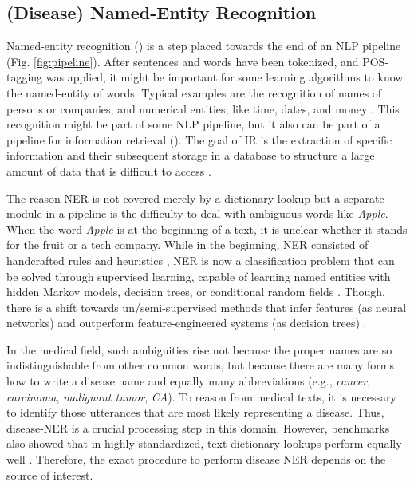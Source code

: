 \subsection{(Disease) Named-Entity Recognition}
  Named-entity recognition () is a step placed towards the end of an NLP pipeline (Fig. \ref{fig:pipeline}).
  After sentences and words have been tokenized, and POS-tagging was applied, it might be important for some learning algorithms to know the named-entity of words.
  Typical examples are the recognition of names of persons or companies, and numerical entities, like time, dates, and money \citep{Nadeau2009}.
  This recognition might be part of some NLP pipeline, but it also can be part of a pipeline for information retrieval ().
  The goal of IR is the extraction of specific information and their subsequent storage in a database to structure a large amount of data that is difficult to access \citep{Manning2008, Wei2011}.

  The reason NER is not covered merely by a dictionary lookup but a separate module in a pipeline is the difficulty to deal with ambiguous words like \textit{Apple}.
  When the word \textit{Apple} is at the beginning of a text, it is unclear whether it stands for the fruit or a tech company.
  While in the beginning, NER consisted of handcrafted rules and heuristics \citep{Rau1991}, NER is now a classification problem that can be solved through supervised learning, capable of learning named entities with hidden Markov models, decision trees, or conditional random fields \citep{Nadeau2009}.
  Though, there is a shift towards un/semi-supervised methods that infer features (as neural networks) and outperform feature-engineered systems (as decision trees) \citep{Yadav2018}.

  In the medical field, such ambiguities rise not because the proper names are so indistinguishable from other common words, but because there are many forms how to write a disease name and equally many abbreviations (e.g., \textit{cancer}, \textit{carcinoma}, \textit{malignant tumor}, \textit{CA}).
  To reason from medical texts, it is necessary to identify those utterances that are most likely representing a disease.
  Thus, disease-NER is a crucial processing step in this domain.
  However, benchmarks also showed that in highly standardized, text dictionary lookups perform equally well \citep{Jimeno2007}.
  Therefore, the exact procedure to perform disease NER depends on the source of interest.

